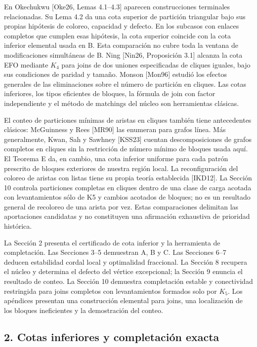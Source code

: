 \documentclass[spanish,11pt,a4paper]{article}
\begin{document}
En Okechukwu {[}Oke26, Lemas 4.1--4.3{]} aparecen construcciones
terminales relacionadas. Su Lema 4.2 da una cota superior de partición
triangular bajo sus propias hipótesis de coloreo, capacidad y defecto.
En los subcasos con enlaces completos que cumplen esas hipótesis, la
cota superior coincide con la cota inferior elemental usada en B. Esta
comparación no cubre toda la ventana de modificaciones simultáneas de B.
Ning {[}Nin26, Proposición 3.1{]} alcanza la cota EFO mediante \(K_4\)
para joins de dos uniones especificadas de cliques iguales, bajo sus
condiciones de paridad y tamaño. Monson {[}Mon96{]} estudió los efectos
generales de las eliminaciones sobre el número de partición en cliques.
Las cotas inferiores, los tipos eficientes de bloques, la fórmula de
join con factor independiente y el método de matchings del núcleo son
herramientas clásicas.

El conteo de particiones mínimas de aristas en cliques también tiene
antecedentes clásicos: McGuinness y Rees {[}MR90{]} las enumeran para
grafos línea. Más generalmente, Kwan, Sah y Sawhney {[}KSS23{]} cuentan
descomposiciones de grafos completos en cliques sin la restricción de
número mínimo de bloques usada aquí. El Teorema E da, en cambio, una
cota inferior uniforme para cada patrón prescrito de bloques exteriores
de nuestra región local. La reconfiguración del coloreo de aristas con
listas tiene su propia teoría establecida {[}IKD12{]}. La Sección 10
controla particiones completas en cliques dentro de una clase de carga
acotada con levantamientos sólo de K5 y cambios acotados de bloques; no
es un resultado general de recoloreo de una arista por vez. Estas
comparaciones delimitan las aportaciones candidatas y no constituyen una
afirmación exhaustiva de prioridad histórica.

La Sección 2 presenta el certificado de cota inferior y la herramienta
de completación. Las Secciones 3--5 demuestran A, B y C. Las Secciones
6--7 deducen estabilidad cordal local y optimalidad fraccional. La
Sección 8 recupera el núcleo y determina el defecto del vértice
excepcional; la Sección 9 enuncia el resultado de conteo. La Sección 10
demuestra completación estable y conectividad restringida para joins
completos con levantamientos formados solo por \(K_5\). Los apéndices
presentan una construcción elemental para joins, una localización de los
bloques ineficientes y la demostración del conteo.

\subsection{2. Cotas inferiores y completación
exacta}\label{cotas-inferiores-y-completaciuxf3n-exacta}
\end{document}
